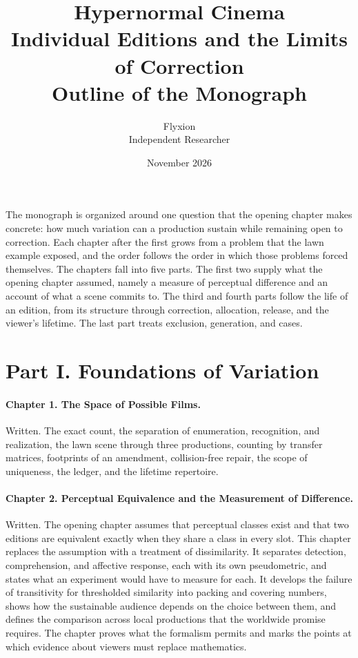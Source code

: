 \documentclass[11pt]{article}
\title{\Large\bfseries Hypernormal Cinema\\[0.5ex]\normalsize Individual Editions and the Limits of Correction\\[0.5ex]\normalsize Outline of the Monograph}
\author{Flyxion\\[0.3ex]\small Independent Researcher}
\date{November 2026}
\begin{document}
\maketitle

The monograph is organized around one question that the opening chapter makes concrete: how much variation can a production sustain while remaining open to correction. Each chapter after the first grows from a problem that the lawn example exposed, and the order follows the order in which those problems forced themselves. The chapters fall into five parts. The first two supply what the opening chapter assumed, namely a measure of perceptual difference and an account of what a scene commits to. The third and fourth parts follow the life of an edition, from its structure through correction, allocation, release, and the viewer's lifetime. The last part treats exclusion, generation, and cases.

\section*{Part I. Foundations of Variation}

\paragraph{Chapter 1. The Space of Possible Films.} Written. The exact count, the separation of enumeration, recognition, and realization, the lawn scene through three productions, counting by transfer matrices, footprints of an amendment, collision-free repair, the scope of uniqueness, the ledger, and the lifetime repertoire.

\paragraph{Chapter 2. Perceptual Equivalence and the Measurement of Difference.} Written. The opening chapter assumes that perceptual classes exist and that two editions are equivalent exactly when they share a class in every slot. This chapter replaces the assumption with a treatment of dissimilarity. It separates detection, comprehension, and affective response, each with its own pseudometric, and states what an experiment would have to measure for each. It develops the failure of transitivity for thresholded similarity into packing and covering numbers, shows how the sustainable audience depends on the choice between them, and defines the comparison across local productions that the worldwide promise requires. The chapter proves what the formalism permits and marks the points at which evidence about viewers must replace mathematics.
\end{document}
